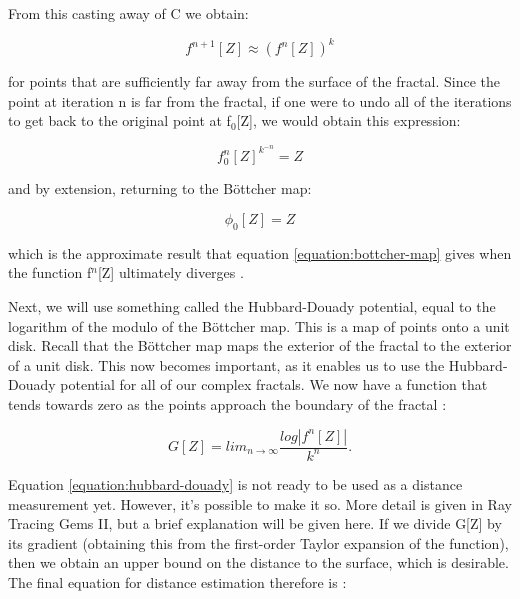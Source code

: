 From this casting away of C we obtain:

\begin{equation} \label{equation:mandelbulb-without-c}
	{f^{n+1}[Z] \approx {(f^n[Z])^k}}
\end{equation}

for points that are sufficiently far away from the surface of the fractal. Since the point at iteration n is far from the fractal, if one were to undo all of the iterations to get back to the original point at f$_0$[Z], we would obtain this expression:

\begin{equation} \label{equation:reverse-iterations}
	{{f_0^{n}[Z]}^{k^{-n}}} = Z
\end{equation}

and by extension, returning to the B\"{o}ttcher map:

\begin{equation} \label{equation:reverse-iterations-bottcher}
	\phi_0[Z] = Z
\end{equation}

which is the approximate result that equation \ref{equation:bottcher-map} gives when the function f$^n$[Z] ultimately diverges \cite{marrs2021ray}.\newline

Next, we will use something called the Hubbard-Douady potential, equal to the logarithm of the modulo of the B\"{o}ttcher map. This is a map of points onto a unit disk. Recall that the B\"{o}ttcher map maps the exterior of the fractal to the exterior of a unit disk. This now becomes important, as it enables us to use the Hubbard-Douady potential for all of our complex fractals. We now have a function that tends towards zero as the points approach the boundary of the fractal \cite{quilez-distance}:

\begin{equation} \label{equation:hubbard-douady}
	G[Z] = {lim_{n\rightarrow\infty}}\frac{log|{f^n}[Z]|}{k^n}.
\end{equation}

Equation \ref{equation:hubbard-douady} is not ready to be used as a distance measurement yet. However, it's possible to make it so. More detail is given in Ray Tracing Gems II, but a brief explanation will be given here. If we divide G[Z] by its gradient (obtaining this from the first-order Taylor expansion of the function), then we obtain an upper bound on the distance to the surface, which is desirable. The final equation for distance estimation therefore is \cite{marrs2021ray}:

